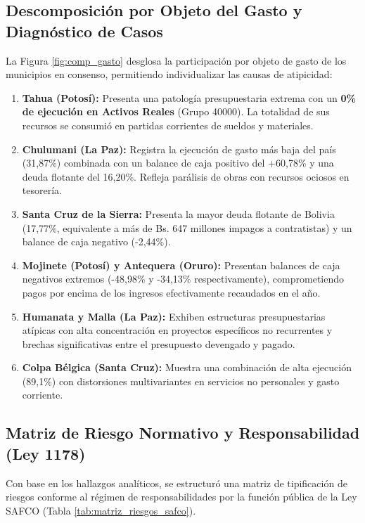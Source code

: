 \documentclass[11pt,a4paper]{article}
\begin{document}
\subsection{Descomposición por Objeto del Gasto y Diagnóstico de Casos}
La Figura \ref{fig:comp_gasto} desglosa la participación por objeto de gasto de los municipios en consenso, permitiendo individualizar las causas de atipicidad:
\begin{enumerate}[label=\textbf{\alph*)}]
    \item \textbf{Tahua (Potosí):} Presenta una patología presupuestaria extrema con un \textbf{0\% de ejecución en Activos Reales} (Grupo 40000). La totalidad de sus recursos se consumió en partidas corrientes de sueldos y materiales.
    \item \textbf{Chulumani (La Paz):} Registra la ejecución de gasto más baja del país (31,87\%) combinada con un balance de caja positivo del +60,78\% y una deuda flotante del 16,20\%. Refleja parálisis de obras con recursos ociosos en tesorería.
    \item \textbf{Santa Cruz de la Sierra:} Presenta la mayor deuda flotante de Bolivia (17,77\%, equivalente a más de Bs. 647 millones impagos a contratistas) y un balance de caja negativo (-2,44\%).
    \item \textbf{Mojinete (Potosí) y Antequera (Oruro):} Presentan balances de caja negativos extremos (-48,98\% y -34,13\% respectivamente), comprometiendo pagos por encima de los ingresos efectivamente recaudados en el año.
    \item \textbf{Humanata y Malla (La Paz):} Exhiben estructuras presupuestarias atípicas con alta concentración en proyectos específicos no recurrentes y brechas significativas entre el presupuesto devengado y pagado.
    \item \textbf{Colpa Bélgica (Santa Cruz):} Muestra una combinación de alta ejecución (89,1\%) con distorsiones multivariantes en servicios no personales y gasto corriente.
\end{enumerate}

\subsection{Matriz de Riesgo Normativo y Responsabilidad (Ley 1178)}
Con base en los hallazgos analíticos, se estructuró una matriz de tipificación de riesgos conforme al régimen de responsabilidades por la función pública de la Ley SAFCO (Tabla \ref{tab:matriz_riesgos_safco}).
\end{document}
